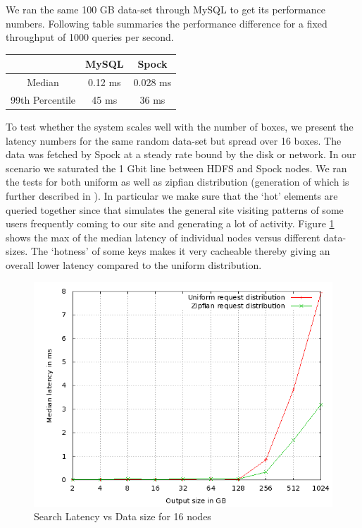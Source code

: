 \documentclass[twocolumn]{article}
\newcommand{\projectname}{Spock}
\begin{document}
We ran the same 100 GB data-set through MySQL to get its performance numbers. Following table summaries the performance difference for a fixed throughput of 1000 queries per second. 

\begin{center}
    \begin{tabular}{ | c | c | c |  }
    \hline
     & MySQL & \projectname{} \\ \hline
    Median &   0.12 ms &  0.028	ms \\
	99th Percentile	& 45 ms & 36 ms \\
\hline
    \end{tabular}
\end{center}

To test whether the system scales well with the number of boxes, we present the latency numbers for the same random data-set but spread over 16 boxes. The data was fetched by \projectname{} at a steady rate bound by the disk or network. In our scenario we saturated the 1 Gbit line between HDFS and \projectname{} nodes. We ran the tests for both uniform as well as zipfian distribution (generation of which is further described in \cite{gray}). In particular we make sure that the `hot' elements are queried together since that simulates the general site visiting patterns of some users frequently coming to our site and generating a lot of activity. Figure \ref{16search} shows the max of the median latency of individual nodes versus different data-sizes. The `hotness' of some keys makes it very cacheable thereby giving an overall lower latency compared to the uniform distribution. 

\begin{figure}
  \centering
    \includegraphics[scale=0.35]{images/search_16node.png}
  \caption{Search Latency vs Data size for 16 nodes}
  \label{16search}
\end{figure}
\end{document}
